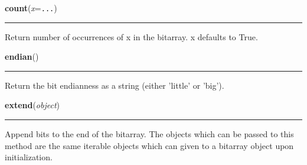     \label{bitarray:_bitarray:count}

    \vspace{0.5ex}

    \begin{boxedminipage}{\textwidth}

    \raggedright \textbf{count}(\textit{x}=\texttt{...})

    \vspace{-1.5ex}

    \rule{\textwidth}{0.5\fboxrule}

Return number of occurrences of x in the bitarray.  x defaults to True.
    \vspace{1ex}

    \end{boxedminipage}

    \label{bitarray:_bitarray:endian}

    \vspace{0.5ex}

    \begin{boxedminipage}{\textwidth}

    \raggedright \textbf{endian}()

    \vspace{-1.5ex}

    \rule{\textwidth}{0.5\fboxrule}

Return the bit endianness as a string (either 'little' or 'big').
    \vspace{1ex}

    \end{boxedminipage}

    \label{bitarray:_bitarray:extend}

    \vspace{0.5ex}

    \begin{boxedminipage}{\textwidth}

    \raggedright \textbf{extend}(\textit{object})

    \vspace{-1.5ex}

    \rule{\textwidth}{0.5\fboxrule}

Append bits to the end of the bitarray.  The objects which can be passed
to this method are the same iterable objects which can given to a bitarray
object upon initialization.
    \vspace{1ex}

    \end{boxedminipage}


